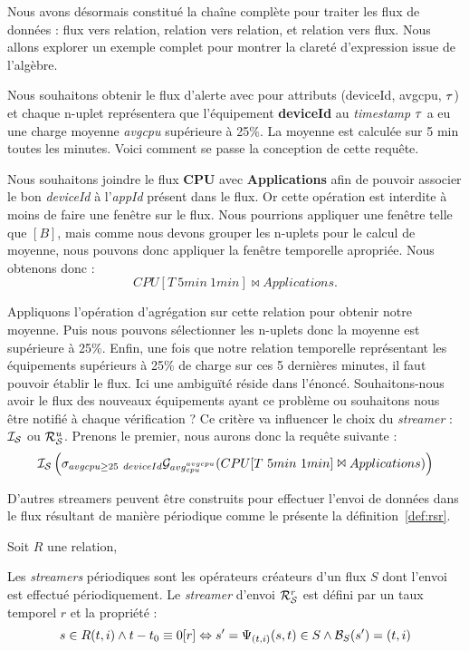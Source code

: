 Nous avons désormais constitué la chaîne complète pour traiter les flux de données : flux vers relation, relation vers relation, et relation vers flux. Nous allons explorer un exemple complet pour montrer la clareté d'expression issue de l'algèbre.
\begin{example}
    Nous souhaitons obtenir le flux d'alerte avec pour attributs (deviceId, avgcpu, $\tau$) et chaque n-uplet représentera que l'équipement \textbf{deviceId} au \textit{timestamp} $\tau$ a eu une charge moyenne \textit{avgcpu} supérieure à 25\%. La moyenne est calculée sur 5 min toutes les minutes. Voici comment se passe la conception de cette requête.

    Nous souhaitons joindre le flux \textbf{CPU} avec \textbf{Applications} afin de pouvoir associer le bon \textit{deviceId} à l'\textit{appId} présent dans le flux. Or cette opération est interdite à moins de faire une fenêtre sur le flux. Nous pourrions appliquer une fenêtre telle que $[B]$, mais comme nous devons grouper les n-uplets pour le calcul de moyenne, nous pouvons donc appliquer la fenêtre temporelle apropriée. Nous obtenons donc : $$CPU[T\ 5min\ 1min]\Join Applications.$$

    Appliquons l'opération d'agrégation sur cette relation pour obtenir notre moyenne. Puis nous pouvons sélectionner les n-uplets donc la moyenne est supérieure à 25\%. Enfin, une fois que notre relation temporelle représentant les équipements supérieurs à 25\% de charge sur ces 5 dernières minutes, il faut pouvoir établir le flux. Ici une ambiguïté réside dans l'énoncé. Souhaitons-nous avoir le flux des nouveaux équipements ayant ce problème ou souhaitons nous être notifié à chaque vérification ? Ce critère va influencer le choix du \textit{streamer} : $\mathcal{I_S}$ ou $\mathcal{R}_{\mathcal S}^u$. Prenons le premier, nous aurons donc la requête suivante : 
    $$\IS\left(\sigma_{avgcpu \geq 25} \ \null_{deviceId}\G_{avg_{cpu}^{avgcpu}} (CPU[T\ 5min\ 1min]\Join Applications)\right)$$
\end{example}

D'autres streamers peuvent être construits pour effectuer l'envoi de données dans le flux résultant de manière périodique comme le présente la définition~\ref{def:rsr}.
\begin{defi}\label{def:rsr}
    Soit $R$ une relation,

    Les \textit{streamers} périodiques sont les opérateurs créateurs d'un flux $S$ dont l'envoi est effectué périodiquement. Le \textit{streamer} d'envoi $\mathcal{R}_{\mathcal S}^r$ est défini par un taux temporel $r$ et la propriété :
$$s\in R(t,i) \wedge t-t_0\equiv 0[r]\Leftrightarrow s'=\Psi_{(t,i)}(s,t)\in S \wedge \mathcal{B}_S(s') = (t,i)$$
\end{defi}

